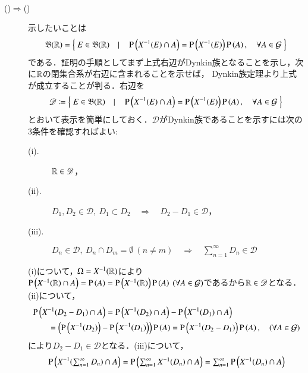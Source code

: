	\begin{prf}\mbox{}\\
		\begin{description}
			\item[()$\Rightarrow$()] 
				示したいことは
				\begin{align}
					\mathfrak{B}(\mathbb{R}) = \left\{\ E \in \mathfrak{B}(\mathbb{R})\quad |\quad \operatorname{P} \left(X^{-1}(E) \cap A\right) = \operatorname{P} \left(X^{-1}(E)\right)\operatorname{P} \left(A\right), \quad \forall A \in \mathcal{G}\ \right\}
				\end{align}
				である．証明の手順としてまず上式右辺がDynkin族となることを示し，次に$\mathbb{R}$の閉集合系が右辺に含まれることを示せば，
				Dynkin族定理より上式が成立することが判る．右辺を
				\begin{align}
					\mathscr{D} \coloneqq \left\{\ E \in \mathfrak{B}(\mathbb{R})\quad |\quad \operatorname{P} \left(X^{-1}(E) \cap A\right) = \operatorname{P} \left(X^{-1}(E)\right)\operatorname{P} \left(A\right), \quad \forall A \in \mathcal{G}\ \right\}
				\end{align}
				とおいて表示を簡単にしておく．$\mathscr{D}$がDynkin族であることを示すには次の3条件を確認すればよい:
				\begin{description}
					\item[\rm{(i).}] $\mathbb{R} \in \mathscr{D}$，
					\item[\rm{(ii).}] $D_1,D_2 \in \mathscr{D},\ D_1 \subset D_2\quad \Rightarrow\quad D_2 - D_1 \in \mathscr{D}$，
					\item[\rm{(iii).}] $D_n \in \mathscr{D},\ D_n \cap D_m = \emptyset\ (n \neq m)\quad \Rightarrow\quad \sum_{n=1}^{\infty} D_n \in \mathscr{D}$
				\end{description}
				(i)について，$\Omega = X^{-1}(\mathbb{R})$により$\operatorname{P} \left(X^{-1}(\mathbb{R}) \cap A\right) = \operatorname{P} \left(A\right) = \operatorname{P} \left(X^{-1}(\mathbb{R})\right)\operatorname{P} \left(A\right)\ (\forall A \in \mathcal{G})$であるから$\mathbb{R} \in \mathscr{D}$となる．
				(ii)について，
				\begin{align}
					&\operatorname{P} \left(X^{-1}(D_2 - D_1) \cap A\right) = \operatorname{P} \left(X^{-1}(D_2) \cap A\right) - \operatorname{P} \left(X^{-1}(D_1) \cap A\right) \\
					&\qquad = \left( \operatorname{P} \left(X^{-1}(D_2)\right) - \operatorname{P} \left(X^{-1}(D_1)\right) \right)\operatorname{P} \left(A\right)
					= \operatorname{P} \left(X^{-1}(D_2 - D_1)\right)\operatorname{P} \left(A\right),\quad (\forall A \in \mathcal{G})
				\end{align}
				により$D_2 - D_1 \in \mathscr{D}$となる．(iii)について，
				\begin{align}
					&\prob{X^{-1}(\textstyle\sum_{n=1}^{\infty} D_n) \cap A} = \prob{\textstyle\sum_{n=1}^{\infty} X^{-1}(D_n) \cap A} = \textstyle\sum_{n=1}^{\infty} \prob{X^{-1}(D_n) \cap A} \\

\end{align}
\end{description}
\end{prf}
